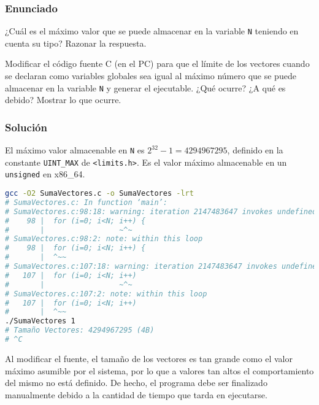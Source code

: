 \subsubsection{Enunciado}

¿Cuál es el máximo valor que se puede almacenar en la variable \texttt{N} teniendo en cuenta su tipo?
Razonar la respuesta.

Modificar el código fuente C (en el PC) para que el límite de los vectores cuando se declaran como variables globales sea igual al máximo número que se puede almacenar en la variable \texttt{N} y generar el ejecutable.
¿Qué ocurre?
¿A qué es debido?
Mostrar lo que ocurre.

\pagebreak

\subsubsection{Solución}

El máximo valor almacenable en \texttt{N} es $2^{32}-1 = 4294967295$, definido en la constante \texttt{UINT\_MAX} de \texttt{<limits.h>}.
Es el valor máximo almacenable en un \texttt{unsigned} en x86\_64.

\begin{lstlisting}[language=sh]
gcc -O2 SumaVectores.c -o SumaVectores -lrt
# SumaVectores.c: In function ‘main’:
# SumaVectores.c:98:18: warning: iteration 2147483647 invokes undefined behavior [-Waggressive-loop-optimizations]
#    98 |  for (i=0; i<N; i++) {
#       |                 ~^~
# SumaVectores.c:98:2: note: within this loop
#    98 |  for (i=0; i<N; i++) {
#       |  ^~~
# SumaVectores.c:107:18: warning: iteration 2147483647 invokes undefined behavior [-Waggressive-loop-optimizations]
#   107 |  for (i=0; i<N; i++)
#       |                 ~^~
# SumaVectores.c:107:2: note: within this loop
#   107 |  for (i=0; i<N; i++)
#       |  ^~~
./SumaVectores 1
# Tamaño Vectores: 4294967295 (4B)
# ^C
\end{lstlisting}

Al modificar el fuente, el tamaño de los vectores es tan grande como el valor máximo asumible por el sistema, por lo que a valores tan altos el comportamiento del mismo no está definido.
De hecho, el programa debe ser finalizado manualmente debido a la cantidad de tiempo que tarda en ejecutarse.
